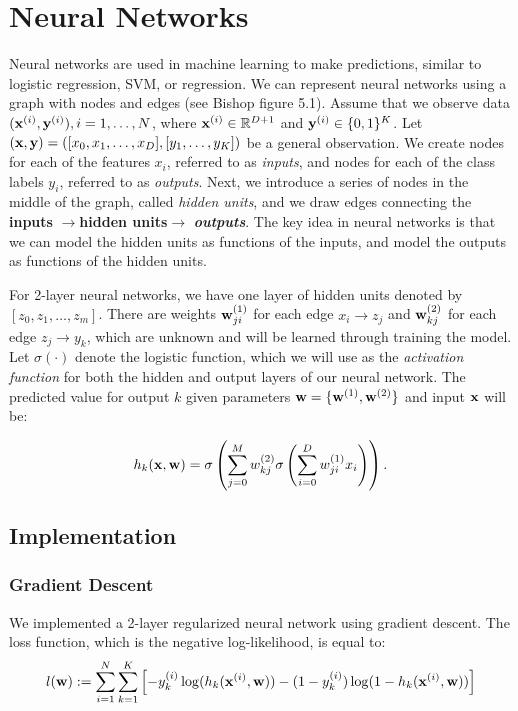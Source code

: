 
\section{Neural Networks}\label{sec:neural_networks}

Neural networks are used in machine learning to make predictions, similar to logistic regression, SVM, or regression.  We can represent neural networks using a graph with nodes and edges (see Bishop figure 5.1).  Assume that we observe data $(\boldsymbol{\mathbf{x}}^{(i)},\boldsymbol{\mathbf{y}}^{(i)}), i = 1, \ldots, N$,  where $\boldsymbol{\mathbf{x}}^{(i)} \in \mathbb{R}^{D+1}$ and $\boldsymbol{\mathbf{y}}^{(i)} \in \{0,1\}^K$.  Let $(\boldsymbol{\mathbf{x}},\boldsymbol{\mathbf{y}}) = ([x_0, x_1, \ldots, x_D],[y_1, \ldots, y_K])$ be a general observation.  We create nodes for each of the features $x_i$, referred to as \emph{inputs}, and nodes for each of the class labels $y_i$, referred to as \emph{outputs}.  Next, we introduce a series of nodes in the middle of the graph, called \emph{hidden units}, and we draw edges connecting the {\bf inputs} $\rightarrow ${\bf hidden units}$ \rightarrow$ \emph{\bf outputs}.  The key idea in neural networks is that we can model the hidden units as functions of the inputs, and model the outputs as functions of the hidden units.   

For 2-layer neural networks, we have one layer of hidden units denoted by $[z_0, z_1,\ldots, z_m]$.   There are weights $\boldsymbol{\mathbf{w}}^{(1)}_{ji}$ for each edge $x_i \rightarrow z_j$ and $\boldsymbol{\mathbf{w}}^{(2)}_{kj}$ for each edge $z_j \rightarrow y_k$, which are unknown and will be learned through training the model.  Let $\sigma(\cdot)$ denote the logistic function, which we will use as the \emph{activation function} for both the hidden and output layers of our neural network.  The predicted value for output $k$ given parameters $\boldsymbol{\mathbf{w}} = \{\boldsymbol{\mathbf{w}}^{(1)}, \boldsymbol{\mathbf{w}}^{(2)}\}$ and input $\boldsymbol{\mathbf{x}}$ will be:

\begin{equation}
h_{k}(\boldsymbol{\mathbf{x}},\boldsymbol{\mathbf{w}}) = \sigma\left(\sum_{j=0}^{M} w^{(2)}_{kj} \sigma\left(\sum_{i=0}^{D} w^{(1)}_{ji} x_i\right)\right).
\end{equation}

\subsection{Implementation}

\subsubsection{Gradient Descent}
We implemented a 2-layer regularized neural network using gradient descent.  The loss function, which is the negative log-likelihood, is equal to:
\begin{equation}
l(\boldsymbol{\mathbf{w}}) := \sum_{i=1}^{N} \sum_{k=1}^{K} \left[ -y_k^{(i)} \log(h_{k}(\boldsymbol{\mathbf{x}}^{(i)}, \boldsymbol{\mathbf{w}})) - (1-y_k^{(i)}) \log(1 - h_{k}(\boldsymbol{\mathbf{x}}^{(i)}, \boldsymbol{\mathbf{w}}))\right]
\end{equation}

